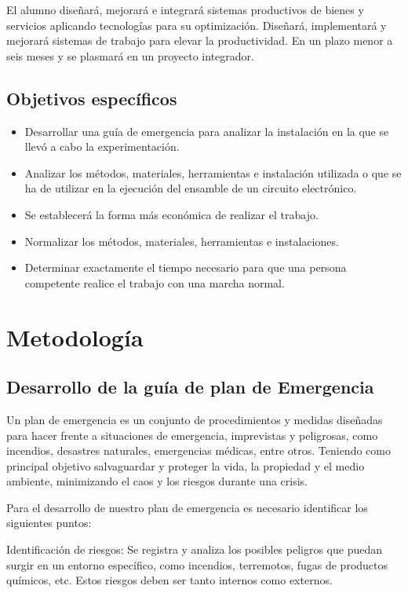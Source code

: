     El alumno diseñará, mejorará e integrará sistemas productivos de bienes y servicios aplicando tecnologías para su optimización.
    Diseñará, implementará y mejorará sistemas de trabajo para elevar la productividad.
    En un plazo menor a seis meses y se plasmará en un proyecto integrador.
    
    
    \subsection{Objetivos específicos}
    
    \begin{itemize}
        \item Desarrollar una guía de emergencia para analizar la instalación en la que se llevó a cabo la experimentación.
        \item Analizar los métodos, materiales, herramientas e instalación utilizada o que se ha de utilizar en la ejecución del ensamble de un circuito electrónico.
        \item Se establecerá la forma más económica de realizar el trabajo.
        \item Normalizar los métodos, materiales, herramientas e instalaciones.
        \item Determinar exactamente el tiempo necesario para que una persona competente realice el trabajo con una marcha normal.
    \end{itemize}
    
    \section{Metodología}
    \subsection{Desarrollo de la guía de plan de Emergencia}
    
    Un plan de emergencia es un conjunto de procedimientos y medidas diseñadas para hacer frente a situaciones  de emergencia, imprevistas y peligrosas, como incendios, desastres naturales, emergencias médicas, entre otros. Teniendo como principal objetivo salvaguardar y proteger la vida, la propiedad y el medio ambiente, minimizando el caos y los riesgos durante una crisis.
    
    Para el desarrollo de nuestro plan de emergencia es necesario identificar los siguientes puntos:
    
    Identificación de riesgos: Se registra y analiza los posibles peligros que puedan surgir en un entorno específico, como incendios, terremotos, fugas de productos químicos, etc. Estos riesgos deben ser tanto internos como externos.
    
